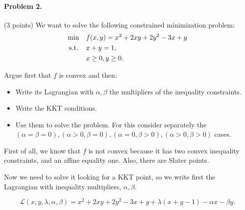 \documentclass[12pt]{scrartcl}
\begin{document}
\begin{boxF}
\paragraph*{Problem 2.} (3 points) \hspace{0.15em} We want to solve the following constrained minimization problem: 
    \begin{align*}
        \mbox{min   \hspace{0.7em}}  & f(x, y) = x^2 + 2xy + 2y^2 - 3x + y \\
        \mbox{s.t.  \hspace{0.7em}} & x + y = 1, \\
        & x \geq 0, y \geq 0.
    \end{align*}
    
Argue first that $f$ is convex and then:

\begin{itemize}
    \item Write its Lagrangian with $\alpha, \beta$ the multipliers of the inequality constraints.
    \item Write the KKT conditions.
    \item Use them to solve the problem. For this consider separately the $(\alpha = \beta = 0), (\alpha > 0, \beta = 0), (\alpha = 0, \beta > 0), (\alpha > 0, \beta > 0)$ cases.
\end{itemize}

\end{boxF}


First of all, we know that $f$ is not convex because it has two convex inequality constraints, and an affine equality one. Also, there are Slater points.

Now we need to solve it looking for a KKT point, so we write first the Lagrangian with inequality multipliers, $\alpha, \beta$.

\begin{equation*}
    \mathcal{L}(x, y, \lambda, \alpha, \beta) = x^2 + 2xy + 2y^2 -3x + y + \lambda(x + y -1) - \alpha x - \beta y.
\end{equation*}
\end{document}
